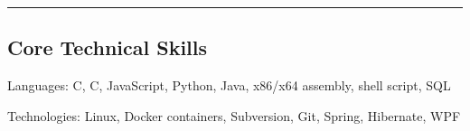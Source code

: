 \documentclass[10pt,letterpaper]{article}
\newenvironment{indentsection}[1]%
{\begin{list}{}%
	{\setlength{\leftmargin}{#1}}%
	\item[]%
}
{\end{list}}
\newcommand{\CPP}
{C\nolinebreak[4]\hspace{-.05em}\raisebox{.22ex}{\footnotesize\bf ++}}
\begin{document}
\hrule
\vspace{-0.4em}
\subsection*{Core Technical Skills}

\begin{indentsection}{\parindent}
\begin{description*}
	\item[Languages:]
	C, \CPP, JavaScript, Python, Java, x86/x64 assembly, shell script, SQL
	\item[Technologies:]
	Linux, Docker containers, Subversion, Git,
   Spring, Hibernate, WPF
\end{description*}
\end{indentsection}
\end{document}
